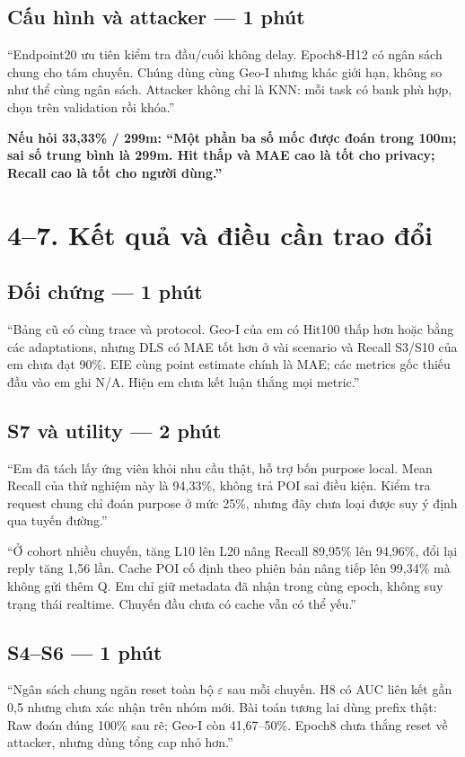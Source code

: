 \documentclass[11pt,a4paper]{article}
\newcommand{\key}[1]{\par\smallskip\noindent\colorbox{pale}{\parbox{\dimexpr\linewidth-2\fboxsep}{\textbf{#1}}}\par\smallskip}
\begin{document}
\subsection*{Cấu hình và attacker — 1 phút}
“Endpoint20 ưu tiên kiểm tra đầu/cuối không delay. Epoch8-H12 có ngân sách chung cho tám chuyến. Chúng dùng cùng Geo-I nhưng khác giới hạn, không so như thể cùng ngân sách. Attacker không chỉ là KNN: mỗi task có bank phù hợp, chọn trên validation rồi khóa.”

\key{Nếu hỏi 33,33\% / 299m: “Một phần ba số mốc được đoán trong 100m; sai số trung bình là 299m. Hit thấp và MAE cao là tốt cho privacy; Recall cao là tốt cho người dùng.”}
\clearpage
\section*{4–7. Kết quả và điều cần trao đổi}
\subsection*{Đối chứng — 1 phút}
“Bảng cũ có cùng trace và protocol. Geo-I của em có Hit100 thấp hơn hoặc bằng các adaptations, nhưng DLS có MAE tốt hơn ở vài scenario và Recall S3/S10 của em chưa đạt 90\%. EIE cùng point estimate chính là MAE; các metrics gốc thiếu đầu vào em ghi N/A. Hiện em chưa kết luận thắng mọi metric.”

\subsection*{S7 và utility — 2 phút}
“Em đã tách lấy ứng viên khỏi nhu cầu thật, hỗ trợ bốn purpose local. Mean Recall của thử nghiệm này là 94,33\%, không trả POI sai điều kiện. Kiểm tra request chung chỉ đoán purpose ở mức 25\%, nhưng đây chưa loại được suy ý định qua tuyến đường.”

“Ở cohort nhiều chuyến, tăng L10 lên L20 nâng Recall 89,95\% lên 94,96\%, đổi lại reply tăng 1,56 lần. Cache POI cố định theo phiên bản nâng tiếp lên 99,34\% mà không gửi thêm Q. Em chỉ giữ metadata đã nhận trong cùng epoch, không suy trạng thái realtime. Chuyến đầu chưa có cache vẫn có thể yếu.”

\subsection*{S4–S6 — 1 phút}
“Ngân sách chung ngăn reset toàn bộ $\varepsilon$ sau mỗi chuyến. H8 có AUC liên kết gần 0,5 nhưng chưa xác nhận trên nhóm mới. Bài toán tương lai dùng prefix thật: Raw đoán đúng 100\% sau rẽ; Geo-I còn 41,67–50\%. Epoch8 chưa thắng reset về attacker, nhưng dùng tổng cap nhỏ hơn.”
\end{document}
